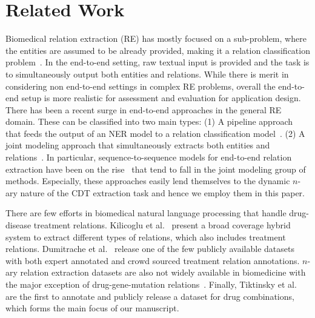 \documentclass[conference]{IEEEtran}
\begin{document}
\section{Related Work}
Biomedical relation extraction (RE)  has mostly focused on a sub-problem, where the entities are assumed to be already provided, making it a relation classification problem~\cite{rink2011automatic,kavuluru2017extracting,liu2016dependency,peng2018extracting}. In the end-to-end setting, raw textual input is provided and the task is to simultaneously output both entities and relations. While there is merit in considering non end-to-end settings in complex RE problems, overall the end-to-end setup is more realistic for assessment and evaluation for application design.
There has been a recent surge in end-to-end approaches in the general RE domain. These can be classified into two main types: (1) A pipeline approach that feeds the output of an NER model to a relation classification model~\cite{zhong-chen-2021-frustratingly}. (2) A joint modeling approach that simultaneously extracts both entities and relations~\cite{miwa2016end,tran2019neural,bekoulis2018joint}.  
In particular, sequence-to-sequence models for end-to-end relation extraction have been on the rise~\cite{giorgi-etal-2022-sequence,zeng-etal-2018-extracting,zeng2020copymtl,nayak2020effective} that tend to fall in the joint modeling group of methods. Especially, these approaches easily lend themselves to the dynamic $n$-ary nature of the CDT extraction task and hence we employ them in this paper. 

There are few efforts in biomedical natural language processing that handle drug-disease treatment relations. Kilicoglu et al.~\cite{kilicoglu2020broad} present a broad coverage hybrid system to extract different types of relations, which also includes treatment relations. Dumitrache et al.~\cite{dumitrache2018crowdsourcing} release one of the few publicly available datasets with both expert annotated and crowd sourced treatment relation annotations. $n$-ary relation extraction datasets are also not widely available in biomedicine with the major exception of drug-gene-mutation relations~\cite{peng-etal-2017-cross}.  Finally, Tiktinsky et al.~\cite{tiktinsky-etal-2022-dataset} are the first to annotate and publicly release a dataset for drug combinations, which forms the main focus of our manuscript. 
\end{document}

